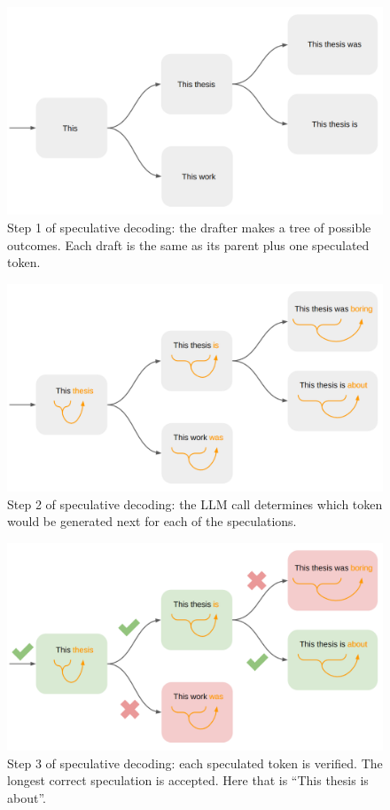 \begin{figure}[H]
	\centering
	\includegraphics[width=0.7\linewidth]{fig/spec_dec_draft.png}
	\caption{Step 1 of speculative decoding: the drafter makes a tree of possible outcomes. Each draft is the same as its parent plus one speculated token.}
	\label{fig:spec_dec_draft}
\end{figure}

\begin{figure}[H]
	\centering
	\includegraphics[width=0.7\linewidth]{fig/spec_dec_llm_call.png}
	\caption{Step 2 of speculative decoding: the LLM call determines which token would be generated next for each of the speculations.}
	\label{fig:spec_dec_llm_call}
\end{figure}

\begin{figure}[H]
	\centering
	\includegraphics[width=0.7\linewidth]{fig/spec_dec_verify.png}
	\caption{Step 3 of speculative decoding: each speculated token is verified. The longest correct speculation is accepted. Here that is ``This thesis is about''.}
	\label{fig:spec_dec_verify}
\end{figure}


